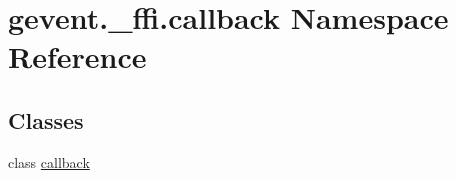 \hypertarget{namespacegevent_1_1__ffi_1_1callback}{}\section{gevent.\+\_\+ffi.\+callback Namespace Reference}
\label{namespacegevent_1_1__ffi_1_1callback}
\subsection*{Classes}
\begin{DoxyCompactItemize}
\item 
class \hyperlink{classgevent_1_1__ffi_1_1callback_1_1callback}{callback}
\end{DoxyCompactItemize}
